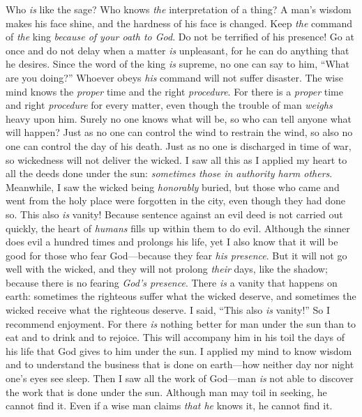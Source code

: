 \begin{biblechapter} %
 Who \textit{is} like the sage? 
Who knows \textit{the} interpretation of a thing? 
A man’s wisdom makes his face shine, 
and the hardness of his face is changed.
\verse Keep \textit{the} command of \textit{the} king 
\textit{because of your oath to God}.
\verse Do not be terrified of his presence! 
Go at once and do not delay when a matter \textit{is} unpleasant, 
for he can do anything that he desires.
\verse Since the word of the king \textit{is} supreme, 
no one can say to him, “What are you doing?”
\verse Whoever obeys \textit{his} command will not suffer disaster. 
The wise mind knows the \textit{proper} time and the right \textit{procedure}.
\verse For there is a \textit{proper} time and right \textit{procedure} for every matter, 
even though the trouble of man \textit{weighs} heavy upon him.
 Surely no one knows what will be, 
so who can tell anyone what will happen?
\verse Just as no one can control the wind to restrain the wind, 
so also no one can control the day of his death. 
Just as no one is discharged in time of war, 
so wickedness will not deliver the wicked.
 I saw all this as I applied my heart to all the deeds done under the sun: \textit{sometimes those in authority harm others}.
\verse Meanwhile, I saw the wicked being \textit{honorably} buried, but those who came and went from the holy place were forgotten in the city, even though they had done so. This also \textit{is} vanity!
 Because sentence against an evil deed is not carried out quickly, the heart of \textit{humans} fills up within them to do evil.
\verse Although the sinner does evil a hundred times and prolongs his life, yet I also know that it will be good for those who fear God—because they fear \textit{his presence}.
\verse But it will not go well with the wicked, and they will not prolong \textit{their} days, like the shadow; because there is no fearing \textit{God’s presence}.
\verse There \textit{is} a vanity that happens on earth: sometimes the righteous suffer what the wicked deserve, and sometimes the wicked receive what the righteous deserve. I said, “This also \textit{is} vanity!”
 So I recommend enjoyment. For there \textit{is} nothing better for man under the sun than to eat and to drink and to rejoice. This will accompany him in his toil the days of his life that God gives to him under the sun.
 I applied my mind to know wisdom and to understand the business that is done on earth—how neither day nor night one’s eyes see sleep.
\verse Then I saw all the work of God—man \textit{is} not able to discover the work that is done under the sun. Although man may toil in seeking, he cannot find it. Even if a wise man claims \textit{that he} knows it, he cannot find it.
\end{biblechapter}

